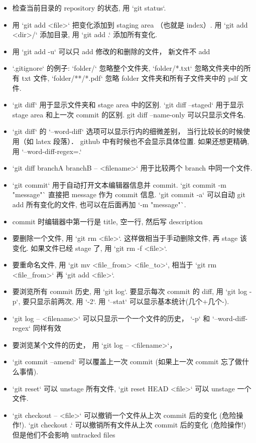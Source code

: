 \begin{itemize}
\item 检查当前目录的 repository 的状态, 用 `git status`. 
\item 用 `git add <file>` 把变化添加到 staging area （也就是 index）. 用 `git add <dir>/` 添加目录, 用 `git add .` 添加所有变化.
\item 用 `git add -u` 可以只 add 修改的和删除的文件， 新文件不 add
\item `.gitignore` 的例子: `folder/` 忽略整个文件夹, `folder/*.txt` 忽略文件夹中的所有 txt 文件, `folder/**/*.pdf` 忽略 folder 文件夹和所有子文件夹中的 pdf 文件.
\item `git diff` 用于显示文件夹和 stage area 中的区别. `git diff --staged` 用于显示 stage area 和上一次 commit 的区别. git diff --name-only  可以只显示文件名.
\item `git diff` 的 `--word-diff` 选项可以显示行内的细微差别， 当行比较长的时候使用（如 latex 段落）． github 中有时候也不会显示具体位置. 如果还想更精确, 用 `--word-diff-regex=.`
\item `git diff branchA branchB -- <filename>` 用于比较两个 branch 中同一个文件.
\item `git commit` 用于自动打开文本编辑器信息并 commit. `git commit -m "message"` 直接把 message 作为 commit 信息. `git commit -a` 可以自动 git add 所有变化的文件, 也可以在后面再加 `-m "message"`.
\item commit 时编辑器中第一行是 title, 空一行, 然后写 description
\item 要删除一个文件, 用 `git rm <file>`. 这样做相当于手动删除文件, 再 stage 该变化. 如果文件已经 stage 了, 用 `git rm -f <file>`.
\item 要重命名文件, 用 `git mv <file_from> <file_to>`, 相当于 `git rm <file_from>` 再 `git add <file>`.
\item 要浏览所有 commit 历史, 用 `git log`. 要显示每次 commit 的 diff, 用 `git log -p`, 要只显示前两次, 用 `-2`. 用 `--stat` 可以显示基本统计(几个+几个-).
\item `git log -- <filename>` 可以只显示一个一个文件的历史， `-p` 和 `--word-diff-regex` 同样有效
\item 要浏览某个文件的历史， 用 `git log -- <filename>`， 
\item `git commit --amend` 可以覆盖上一次 commit (如果上一次 commit 忘了做什么事情).
\item `git reset` 可以 unstage 所有文件, `git reset HEAD <file>` 可以 unstage 一个文件.
\item `git checkout -- <file>` 可以撤销一个文件从上次 commit 后的变化 (危险操作!). `git checkout .` 可以撤销所有文件从上次 commit 后的变化 (危险操作!) 但是他们不会影响 untracked files

\end{itemize}
